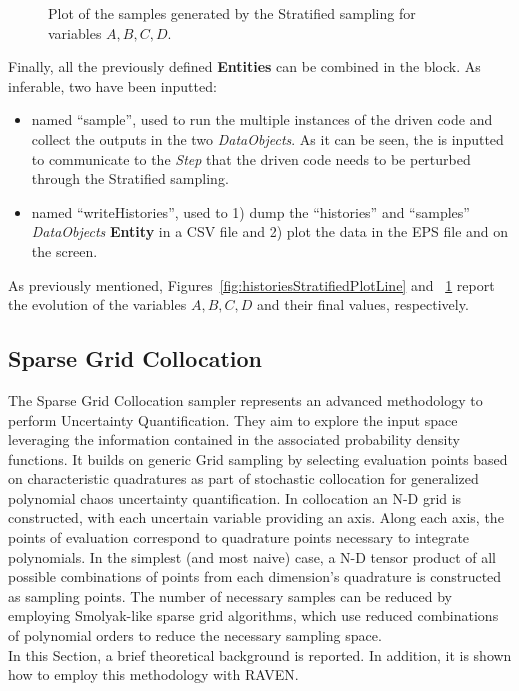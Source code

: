 \begin{enumerate}
\begin{figure}[h!]
  \caption{Plot of the samples generated by the Stratified sampling for variables $A,B,C,D$.}
  \label{fig:samplesStratifiedPlotLine}
 \end{figure}
   Finally, all the previously defined \textbf{Entities} can be combined in
   the  block. As inferable,
   two  have been inputted:
   \begin{itemize}
     \item {} named ``sample'', used to run the multiple
     instances of the driven code and
     collect the outputs in the two \textit{DataObjects}. As it can be
     seen, the  is inputted to communicate to the
     \textit{Step} that the driven code needs to
     be perturbed through the Stratified sampling.
     \item  {} named ``writeHistories'', used to 1) dump
     the ``histories'' and ``samples'' \textit{DataObjects}
     \textbf{Entity} in a CSV file and 2) plot the data in the EPS file and
     on the screen.
   \end{itemize}
\end{enumerate}
 As previously mentioned, Figures~\ref{fig:historiesStratifiedPlotLine} and ~\ref{fig:samplesStratifiedPlotLine}  report the evolution of the
 variables $A,B,C,D$ and their final values, respectively.


\subsection{Sparse Grid Collocation}
\label{sub:SGC}
The Sparse Grid Collocation sampler represents an advanced methodology to perform Uncertainty Quantification. They aim
to explore the input space leveraging the information contained in the associated probability density functions. It builds on generic Grid sampling by selecting evaluation points based on characteristic quadratures as part of stochastic collocation for generalized polynomial chaos uncertainty quantification. In collocation an N-D grid is constructed, with each uncertain variable providing an axis. Along each axis, the points of evaluation correspond to quadrature points necessary to integrate polynomials. In the simplest (and most naive) case, a N-D tensor product of all possible combinations of points from each dimension’s quadrature is constructed as sampling points. The number of necessary samples can be reduced by employing Smolyak-like sparse grid algorithms, which use reduced combinations of polynomial orders to reduce the necessary sampling space.
\\In this Section, a brief theoretical
background is reported. In addition, it is shown how to employ this methodology with RAVEN.
